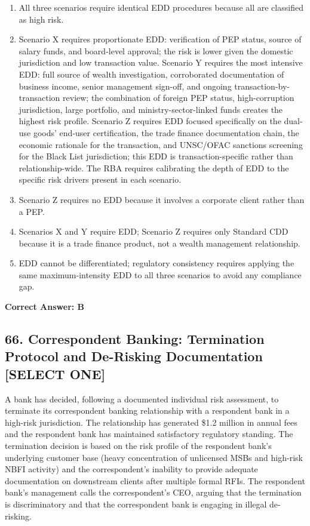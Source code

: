 \documentclass[11pt,a4paper]{article}
\begin{document}
	\begin{enumerate}[label=\Alph*.]
		\item All three scenarios require identical EDD procedures because all are classified as high risk.
		\item Scenario X requires proportionate EDD: verification of PEP status, source of salary funds, and board-level approval; the risk is lower given the domestic jurisdiction and low transaction value. Scenario Y requires the most intensive EDD: full source of wealth investigation, corroborated documentation of business income, senior management sign-off, and ongoing transaction-by-transaction review; the combination of foreign PEP status, high-corruption jurisdiction, large portfolio, and ministry-sector-linked funds creates the highest risk profile. Scenario Z requires EDD focused specifically on the dual-use goods' end-user certification, the trade finance documentation chain, the economic rationale for the transaction, and UNSC/OFAC sanctions screening for the Black List jurisdiction; this EDD is transaction-specific rather than relationship-wide. The RBA requires calibrating the depth of EDD to the specific risk drivers present in each scenario.
		\item Scenario Z requires no EDD because it involves a corporate client rather than a PEP.
		\item Scenarios X and Y require EDD; Scenario Z requires only Standard CDD because it is a trade finance product, not a wealth management relationship.
		\item EDD cannot be differentiated; regulatory consistency requires applying the same maximum-intensity EDD to all three scenarios to avoid any compliance gap.
	\end{enumerate}
	\textbf{Correct Answer: B}
	
	\subsection{66. Correspondent Banking: Termination Protocol and De-Risking Documentation \textnormal{[SELECT ONE]}}
	
	A bank has decided, following a documented individual risk assessment, to terminate its correspondent banking relationship with a respondent bank in a high-risk jurisdiction. The relationship has generated \$1.2 million in annual fees and the respondent bank has maintained satisfactory regulatory standing. The termination decision is based on the risk profile of the respondent bank's underlying customer base (heavy concentration of unlicensed MSBs and high-risk NBFI activity) and the correspondent's inability to provide adequate documentation on downstream clients after multiple formal RFIs. The respondent bank's management calls the correspondent's CEO, arguing that the termination is discriminatory and that the correspondent bank is engaging in illegal de-risking.
	
\end{document}
